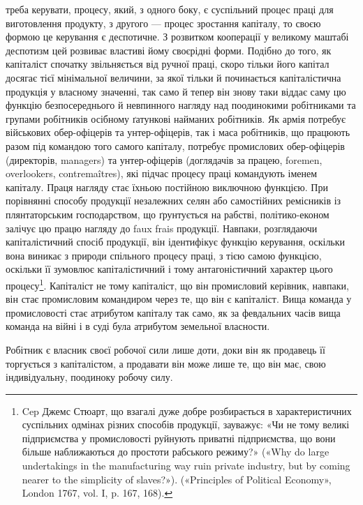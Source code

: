 \parcont{}  %
треба керувати, процесу, який, з одного боку, є суспільний процес
праці для виготовлення продукту, з другого — процес зростання
капіталу, то своєю формою це керування є деспотичне. З розвитком
кооперації у великому маштабі деспотизм цей розвиває властиві
йому своєрідні форми. Подібно до того, як капіталіст спочатку
звільняється від ручної праці, скоро тільки його капітал
досягає тієї мінімальної величини, за якої тільки й починається
капіталістична продукція у власному значенні, так само й тепер
він знову таки віддає саму цю функцію безпосереднього й невпинного
нагляду над поодинокими робітниками та групами робітників
осібному ґатункові найманих робітників. Як армія потребує
військових обер-офіцерів та унтер-офіцерів, так і маса робітників,
що працюють разом під командою того самого капіталу,
потребує промислових обер-офіцерів (директорів, managers)
та унтер-офіцерів (доглядачів за працею, foremen, overlookers,
contremaîtres), які підчас процесу праці командують іменем
капіталу. Праця нагляду стає їхньою постійною виключною
функцією. При порівнянні способу продукції незалежних селян
або самостійних ремісників із плянтаторським господарством,
що ґрунтується на рабстві, політико-економ залічує цю працю
нагляду до faux frais продукції. Навпаки, розглядаючи капіталістичний
спосіб продукції, він ідентифікує функцію керування,
оскільки вона виникає з природи спільного процесу праці, з
тією самою функцією, оскільки її зумовлює капіталістичний і
тому антагоністичний характер цього процесу\footnote{
Cep Джемс Стюарт, що взагалі дуже добре розбирається в характеристичних
суспільних одмінах різних способів продукції, зауважує:
«Чи не тому великі підприємства у промисловості руйнують приватні
підприємства, що вони більше наближаються до простоти рабського режиму?»
(«Why do large undertakings in the manufacturing way ruin private
industry, but by coming nearer to the simplicity of slaves?»). («Principles
of Political Economy», London 1767, vol. I, p. 167, 168).
}. Капіталіст не
тому капіталіст, що він промисловий керівник, навпаки, він стає
промисловим командиром через те, що він є капіталіст. Вища
команда у промисловості стає атрибутом капіталу так само, як
за февдальних часів вища команда на війні і в суді була атрибутом
земельної власности.

Робітник є власник своєї робочої сили лише доти, доки він
як продавець її торгується з капіталістом, а продавати він може
лише те, що він має, свою індивідуальну, поодиноку робочу силу.
\parbreak{}  %
